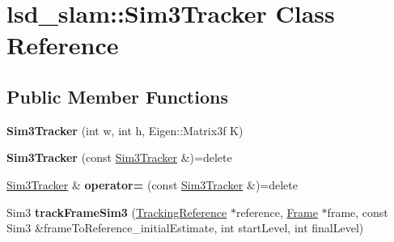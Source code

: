 \hypertarget{classlsd__slam_1_1_sim3_tracker}{\section{lsd\-\_\-slam\-:\-:Sim3\-Tracker Class Reference}
\label{classlsd__slam_1_1_sim3_tracker}
}
\subsection*{Public Member Functions}
\begin{DoxyCompactItemize}
\item 
\hypertarget{classlsd__slam_1_1_sim3_tracker_afeb7412d22bc1ce5faf6634691998ae8}{{\bfseries Sim3\-Tracker} (int w, int h, Eigen\-::\-Matrix3f K)}\label{classlsd__slam_1_1_sim3_tracker_afeb7412d22bc1ce5faf6634691998ae8}

\item 
\hypertarget{classlsd__slam_1_1_sim3_tracker_a956f20fd1343ed637a0abf2dda9c3527}{{\bfseries Sim3\-Tracker} (const \hyperlink{classlsd__slam_1_1_sim3_tracker}{Sim3\-Tracker} \&)=delete}\label{classlsd__slam_1_1_sim3_tracker_a956f20fd1343ed637a0abf2dda9c3527}

\item 
\hypertarget{classlsd__slam_1_1_sim3_tracker_ad3e8d6344641e826e6ffda036d4f7a04}{\hyperlink{classlsd__slam_1_1_sim3_tracker}{Sim3\-Tracker} \& {\bfseries operator=} (const \hyperlink{classlsd__slam_1_1_sim3_tracker}{Sim3\-Tracker} \&)=delete}\label{classlsd__slam_1_1_sim3_tracker_ad3e8d6344641e826e6ffda036d4f7a04}

\item 
\hypertarget{classlsd__slam_1_1_sim3_tracker_a7cda8e0a6e18eeb3bca97a285bbe3c59}{Sim3 {\bfseries track\-Frame\-Sim3} (\hyperlink{classlsd__slam_1_1_tracking_reference}{Tracking\-Reference} $\ast$reference, \hyperlink{classlsd__slam_1_1_frame}{Frame} $\ast$frame, const Sim3 \&frame\-To\-Reference\-\_\-initial\-Estimate, int start\-Level, int final\-Level)}\label{classlsd__slam_1_1_sim3_tracker_a7cda8e0a6e18eeb3bca97a285bbe3c59}

\end{DoxyCompactItemize}
